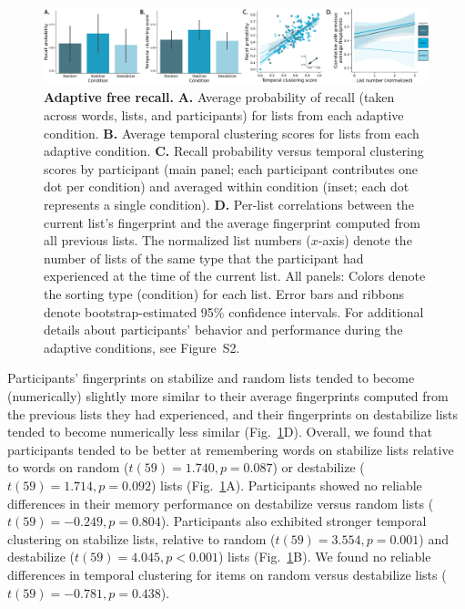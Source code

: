 \documentclass[11pt]{article}
\newcommand{\dynamicsAdaptive}{S2}
\begin{document}
\begin{figure} 
    \centering

    \includegraphics[width=\textwidth]{figures/adaptive_results}
        
        \caption{\textbf{Adaptive free recall.} \textbf{A.} Average probability
        of recall (taken across words, lists, and participants) for lists from
        each adaptive condition. \textbf{B.} Average temporal clustering scores
        for lists from each adaptive condition. \textbf{C.} Recall probability
        versus temporal clustering scores by participant (main panel; each
        participant contributes one dot per condition) and averaged within
        condition (inset; each dot represents a single condition). \textbf{D.}
        Per-list correlations between the current list's fingerprint and the
        average fingerprint computed from all previous lists. The normalized
        list numbers ($x$-axis) denote the number of lists of the same type
        that the participant had experienced at the time of the current list.
        All panels: Colors denote the sorting type (condition) for each list.
        Error bars and ribbons denote bootstrap-estimated 95\% confidence
        intervals. For additional details about participants' behavior and
        performance during the adaptive conditions, see
        Figure~\dynamicsAdaptive.}

    \label{fig:adaptive}
\end{figure}

Participants' fingerprints on stabilize and random lists tended to become
(numerically) slightly more similar to their average fingerprints computed from the
previous lists they had experienced, and their fingerprints on destabilize
lists tended to become numerically less similar (Fig.~\ref{fig:adaptive}D).
Overall, we found that participants tended to be better at remembering words on
stabilize lists relative to words on random ($t(59) = 1.740, p = 0.087$) or
destabilize ($t(59) = 1.714, p = 0.092$) lists (Fig.~\ref{fig:adaptive}A).
Participants showed no reliable differences in their memory performance on
destabilize versus random lists ($t(59) = -0.249, p = 0.804$). Participants
also exhibited stronger temporal clustering on stabilize lists, relative to
random ($t(59) = 3.554, p = 0.001$) and destabilize ($t(59) = 4.045, p <
0.001$) lists (Fig.~\ref{fig:adaptive}B). We found no reliable differences in
temporal clustering for items on random versus destabilize lists ($t(59) =
-0.781, p = 0.438$).
\end{document}
